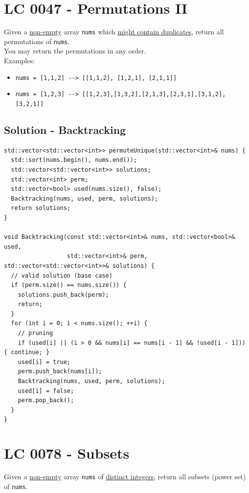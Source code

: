 \section{LC 0047 - Permutations II}
Given a \ul{non-empty} array {\colorbox{CodeBackground}{\lstinline|nums|}} which \ul{might contain duplicates}, return all permutations of {\colorbox{CodeBackground}{\lstinline|nums|}}.\\

You may return the permutations in any order.\\

Examples:
\begin{itemize}
	\item {\colorbox{CodeBackground}{\lstinline|nums = [1,1,2] --> [[1,1,2], [1,2,1], [2,1,1]]|}}
	\item {\colorbox{CodeBackground}{\lstinline|nums = [1,2,3] --> [[1,2,3],[1,3,2],[2,1,3],[2,3,1],[3,1,2],[3,2,1]]|}}
\end{itemize}

\subsection*{Solution - Backtracking}
\begin{lstlisting}
std::vector<std::vector<int>> permuteUnique(std::vector<int>& nums) {
  std::sort(nums.begin(), nums.end());
  std::vector<std::vector<int>> solutions;
  std::vector<int> perm;
  std::vector<bool> used(nums.size(), false);
  Backtracking(nums, used, perm, solutions);
  return solutions;
}

void Backtracking(const std::vector<int>& nums, std::vector<bool>& used,
                  std::vector<int>& perm, std::vector<std::vector<int>>& solutions) {
  // valid solution (base case)
  if (perm.size() == nums.size()) {
    solutions.push_back(perm);
    return;
  }
  for (int i = 0; i < nums.size(); ++i) {
    // pruning
    if (used[i] || (i > 0 && nums[i] == nums[i - 1] && !used[i - 1])) { continue; }
    used[i] = true;
    perm.push_back(nums[i]);
    Backtracking(nums, used, perm, solutions);
    used[i] = false;
    perm.pop_back();
  }
}
\end{lstlisting}

\section{LC 0078 - Subsets}
Given a \ul{non-empty} array {\colorbox{CodeBackground}{\lstinline|nums|}} of \ul{distinct integers}, return all subsets (power set) of {\colorbox{CodeBackground}{\lstinline|nums|}}.\\

